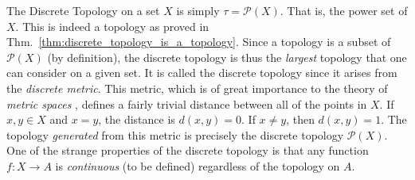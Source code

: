     \begin{example}
        The Discrete Topology
        on a set $X$ is simply $\tau=\mathcal{P}(X)$. That is, the
        \gls{power set} of $X$. This is indeed a topology as
        proved in Thm.~\ref{thm:discrete_topology_is_a_topology}. Since a
        topology is a subset of $\mathcal{P}(X)$ (by definition), the discrete
        topology is thus the \textit{largest} topology that one can consider on
        a given set. It is called the discrete topology since it arises from the
        \textit{discrete metric}. This metric, which is
        of great importance to the theory of \textit{metric spaces}%
        , defines a fairly trivial distance between all of
        the points in $X$. If $x,y\in{X}$ and $x=y$, the distance is
        $d(x,y)=0$. If $x\ne{y}$, then $d(x,y)=1$. The topology
        \textit{generated} from this metric
        is precisely the discrete topology $\mathcal{P}(X)$. One of the strange
        properties of the discrete topology is that any function
        $f:X\rightarrow{A}$ is \textit{continuous} (to be defined)%
        regardless of the topology on $A$.
    \end{example}
